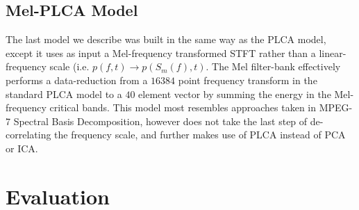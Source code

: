 \documentclass[a4paper,10pt,final]{ThesisStyle}
\begin{document}

\subsection{Mel-PLCA Model}

The last model we describe was built in the same way as the PLCA model, except it uses as input a Mel-frequency transformed STFT rather than a linear-frequency scale (i.e. $p(f,t) \rightarrow p(S_m(f),t)$.  The Mel filter-bank effectively performs a data-reduction from a $16384$ point frequency transform in the standard PLCA model to a $40$ element vector by summing the energy in the Mel-frequency critical bands.  This model most resembles approaches taken in MPEG-7 Spectral Basis Decomposition, however does not take the last step of de-correlating the frequency scale, and further makes use of PLCA instead of PCA or ICA.  %

\section{Evaluation}



\end{document}
